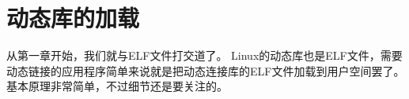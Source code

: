 \chapter{动态库的加载}
从第一章开始，我们就与ELF文件打交道了。
Linux的动态库也是ELF文件，需要动态链接的应用程序简单来说就是把动态连接库的ELF文件加载到用户空间罢了。
基本原理非常简单，不过细节还是要关注的。

